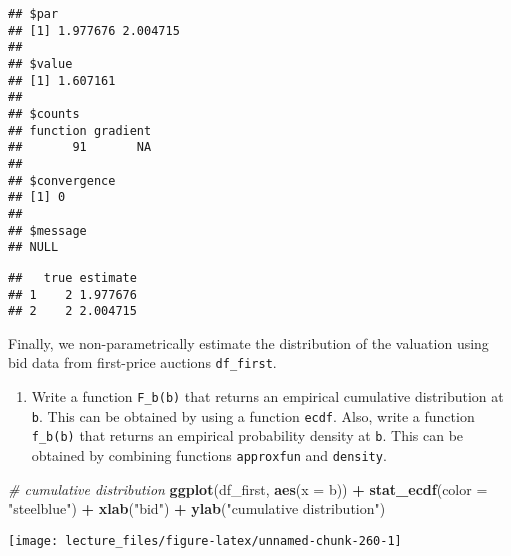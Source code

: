 \documentclass[
]{book}
\newenvironment{Shaded}{\begin{snugshade}}{\end{snugshade}}
\newcommand{\CommentTok}[1]{\textcolor[rgb]{0.56,0.35,0.01}{\textit{#1}}}
\newcommand{\DataTypeTok}[1]{\textcolor[rgb]{0.13,0.29,0.53}{#1}}
\newcommand{\KeywordTok}[1]{\textcolor[rgb]{0.13,0.29,0.53}{\textbf{#1}}}
\newcommand{\NormalTok}[1]{#1}
\newcommand{\OperatorTok}[1]{\textcolor[rgb]{0.81,0.36,0.00}{\textbf{#1}}}
\newcommand{\StringTok}[1]{\textcolor[rgb]{0.31,0.60,0.02}{#1}}
\providecommand{\tightlist}{%
  \setlength{\itemsep}{0pt}\setlength{\parskip}{0pt}}
\begin{document}
\begin{verbatim}
## $par
## [1] 1.977676 2.004715
## 
## $value
## [1] 1.607161
## 
## $counts
## function gradient 
##       91       NA 
## 
## $convergence
## [1] 0
## 
## $message
## NULL
\end{verbatim}

\begin{Shaded}
\end{Shaded}

\begin{verbatim}
##   true estimate
## 1    2 1.977676
## 2    2 2.004715
\end{verbatim}

Finally, we non-parametrically estimate the distribution of the valuation using bid data from first-price auctions \texttt{df\_first}.

\begin{enumerate}
\def\labelenumi{\arabic{enumi}.}
\setcounter{enumi}{9}
\tightlist
\item
  Write a function \texttt{F\_b(b)} that returns an empirical cumulative distribution at \texttt{b}. This can be obtained by using a function \texttt{ecdf}.
  Also, write a function \texttt{f\_b(b)} that returns an empirical probability density at \texttt{b}. This can be obtained by combining functions \texttt{approxfun} and \texttt{density}.
\end{enumerate}

\begin{Shaded}
\begin{Highlighting}[]
\CommentTok{# cumulative distribution}
\KeywordTok{ggplot}\NormalTok{(df_first, }\KeywordTok{aes}\NormalTok{(}\DataTypeTok{x =}\NormalTok{ b)) }\OperatorTok{+}\StringTok{ }\KeywordTok{stat_ecdf}\NormalTok{(}\DataTypeTok{color =} \StringTok{"steelblue"}\NormalTok{) }\OperatorTok{+}
\StringTok{  }\KeywordTok{xlab}\NormalTok{(}\StringTok{"bid"}\NormalTok{) }\OperatorTok{+}\StringTok{ }\KeywordTok{ylab}\NormalTok{(}\StringTok{"cumulative distribution"}\NormalTok{)}
\end{Highlighting}
\end{Shaded}

\begin{center}\texttt{[image: lecture\_files/figure-latex/unnamed-chunk-260-1]} \end{center}
\end{document}
